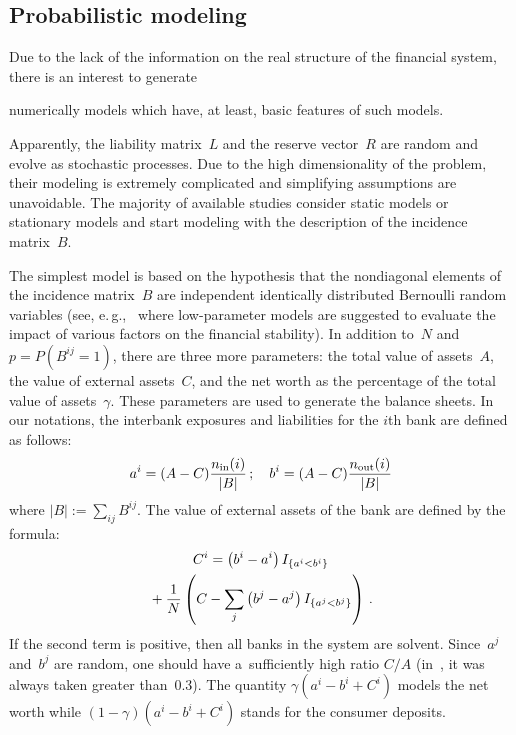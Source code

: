 \begin{multicols}{2}
\vspace*{-4pt}

\subsection{Probabilistic modeling}

\vspace*{-2pt}

\noindent
Due to the lack  of the information on the real structure of the financial 
system, there is an 
interest to generate\linebreak\vspace*{-12pt}

\pagebreak

\noindent
 numerically models which have, at least, basic features of 
such models. 
 
Apparently, the liability  matrix~$L$ and the reserve vector~$R$ are random and 
evolve as stochastic processes. Due to the high dimensionality of the problem, 
their modeling is extremely complicated and simplifying assumptions are 
unavoidable.  The majority of available studies consider static models or 
stationary models and start  modeling with the description of the incidence 
matrix~$B$. 

The simplest model is based on the hypothesis that the nondiagonal elements of 
the incidence matrix~$B$ are independent identically  distributed Bernoulli 
random variables (see, e.\,g.,~\cite{NierYYA} where low-parameter models are 
suggested to evaluate the impact of various factors on the financial stability).  
In addition to~$N$ and $p=P(B^{ij}=1)$, there are three more parameters: 
the total value of assets~$A$, the value of external assets~$C$, and the net 
worth as the percentage of the total value of assets~$\gamma$. 
These parameters are used to generate the balance sheets. In our notations, the 
interbank exposures and liabilities for the $i$th bank are defined as follows: 
$$
a^i = (A-C)\displaystyle\frac{\displaystyle n_{\mathrm{in}}(i)\mathstrut}{\displaystyle |B|\mathstrut}\,; 
\quad b^i = (A-C)\displaystyle\frac{\displaystyle n_{\mathrm{out}}(i)\mathstrut}{\displaystyle |B|\mathstrut}
$$
 where $|B|:= \sum\nolimits_{ij}B^{ij}$. The value of external assets of the bank are 
defined by the formula:
 \begin{multline*}
C^i= \left(b^i - a^i\right)I_{\{a^i < b^i\}}\\
{}+ \displaystyle\frac{\displaystyle 1\mathstrut}{\displaystyle N\mathstrut}
 \left(C  - \sum\limits_j \left(b^j - a^j\right)I_{\{a^j 
< b^j\}}\right)\,.  
 \end{multline*}    
If the second term is positive, then all banks in the system are solvent. Since~$a^j$ 
and~$b^j$ are random,  one should have a~sufficiently high  ratio $C/A$ 
(in~\cite{NierYYA}, it was always taken greater than~0.3).  The  quantity 
$\gamma (a^ i-b^i +C^i)$ models the net worth while $(1-\gamma) (a^ i-b^i +C^i)$ 
stands for the consumer deposits. 


\end{multicols}
